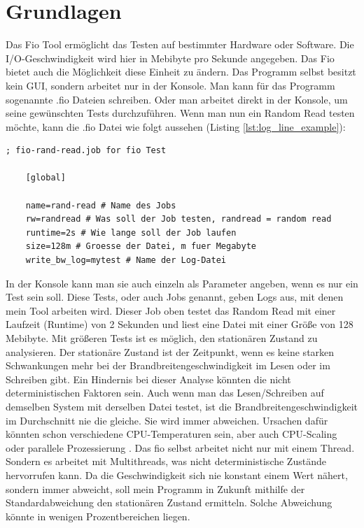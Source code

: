 \documentclass{article}
\begin{document}
\section{Grundlagen}
Das Fio Tool ermöglicht das Testen auf bestimmter Hardware oder Software. Die I/O-Geschwindigkeit wird hier in Mebibyte pro Sekunde angegeben. Das Fio bietet auch die Möglichkeit diese Einheit zu ändern.
Das Programm selbst besitzt kein GUI, sondern arbeitet nur in der Konsole. Man kann für das Programm sogenannte .fio Dateien schreiben. Oder man arbeitet direkt in der Konsole,
um seine gewünschten Tests durchzuführen.
Wenn man nun ein Random Read testen möchte, kann die .fio Datei wie folgt aussehen (Listing \ref{lst:log_line_example}):
\newpage
\begin{lstlisting}[caption=Beispiel für eine .fio Datei,label={lst:fio_file_example}]
    ; fio-rand-read.job for fio Test

    [global]

    name=rand-read # Name des Jobs
    rw=randread # Was soll der Job testen, randread = random read
    runtime=2s # Wie lange soll der Job laufen
    size=128m # Groesse der Datei, m fuer Megabyte
    write_bw_log=mytest # Name der Log-Datei
\end{lstlisting}
\bigskip
In der Konsole kann man sie auch einzeln als Parameter angeben, wenn es nur ein Test sein soll.
Diese Tests, oder auch Jobs genannt, geben Logs aus, mit denen mein Tool arbeiten wird. Dieser Job oben testet das Random Read mit einer
Laufzeit (Runtime) von 2 Sekunden und liest eine Datei mit einer Größe von 128 Mebibyte. Mit größeren Tests ist es möglich, den stationären Zustand zu analysieren. 
Der stationäre Zustand ist der Zeitpunkt, wenn es keine starken Schwankungen mehr bei der Brandbreitengeschwindigkeit im Lesen oder im Schreiben gibt.
Ein Hindernis bei dieser Analyse könnten die nicht deterministischen Faktoren sein.
Auch wenn man das Lesen/Schreiben auf demselben System mit derselben Datei testet, ist die Brandbreitengeschwindigkeit im Durchschnitt nie die gleiche. Sie wird immer abweichen.
Ursachen dafür könnten schon verschiedene CPU-Temperaturen sein, aber auch CPU-Scaling oder parallele Prozessierung \cite{baseline}.
Das fio selbst arbeitet nicht nur mit einem Thread. Sondern es arbeitet mit Multithreads, was nicht deterministische Zustände hervorrufen kann.
Da die Geschwindigkeit sich nie konstant einem Wert nähert, sondern immer abweicht, soll mein Programm in Zukunft mithilfe der Standardabweichung den stationären Zustand ermitteln.
Solche Abweichung könnte in wenigen Prozentbereichen liegen. 
\end{document}
